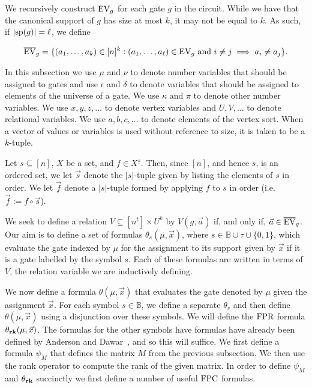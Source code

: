 \documentclass[../paper.tex]{subfiles}
\begin{document}
We recursively construct $\text{EV}_g$ for each gate $g$ in the circuit. While we have
that the canonical support of $g$ has size at most $k$, it may not be equal to
$k$. As such, if $\vert \text{sp}(g) \vert = \ell$, we define

\begin{align*}
	\overline{\text{EV}}_g = \{ (a_1, \ldots , a_k) \in [n]^k : (a_1 , \ldots , a_\ell ) \in \text{EV}_g \text{ and } i \neq j \implies a_i \neq a_j \}. 
\end{align*}

In this subsection we use $\mu$ and $\nu$ to denote number variables that should
be assigned to gates and use $\epsilon$ and $\delta$ to denote variables that
should be assigned to elements of the universe of a gate. We use $\kappa$ and
$\pi$ to denote other number variables. We use $x, y, z, \ldots$ to denote
vertex variables and $U, V, \ldots$ to denote relational variables. We use $a,
b, c , \ldots$ to denote elements of the vertex sort. When a vector of values or
variables is used without reference to size, it is taken to be a $k$-tuple.

Let $s \subseteq [n]$, $X$ be a set, and $f \in X^{\underline{s}}$. Then, since
$[n]$, and hence $s$, is an ordered set, we let $\vec{s}$ denote the $\vert s
\vert$-tuple given by listing the elements of $s$ in order. We let $\vec{f}$
denote a $\vert s \vert$-tuple formed by applying $f$ to $s$ in order (i.e.
$\vec{f} := f \circ \vec{s}$).

We seek to define a relation $V \subseteq [n^t] \times U^k$ by $V(g, \vec{a})$
if, and only if, $\vec{a} \in \overline {\text{EV}}_g$. Our aim is to define a set of
formulas $\theta_s (\mu, \vec{x})$, where $s \in \mathbb{B} \cup \tau \cup
\{0,1\}$, which evaluate the gate indexed by $\mu$ for the assignment to its
support given by $\vec{x}$ if it is a gate labelled by the symbol $s$. Each of
these formulas are written in terms of $V$, the relation variable we are
inductively defining.

We now define a formula $\theta(\mu, \vec{x})$ that evaluates the gate denoted
by $\mu$ given the assignment $\vec{x}$. For each symbol $s \in \mathbb{B}$, we
define a separate $\theta_s$ and then define $\theta(\mu, \vec{x})$ using a
disjunction over these symbols. We will define the $\text{\upshape FPR}$ formula $\theta_{\text{\textbf{rk}}}
(\mu, \vec{x})$. The formulas for the other symbols have formulas have already
been defined by Anderson and Dawar~\cite{AndersonD17}, and so this will suffice.
We first define a formula $\psi_M$ that defines the matrix $M$ from the previous
subsection. We then use the rank operator to compute the rank of the given
matrix. In order to define $\psi_M$ and $\theta_{\text{\textbf{rk}}}$ succinctly we first
define a number of useful $\text{\upshape FPC}$ formulas.
\end{document}
